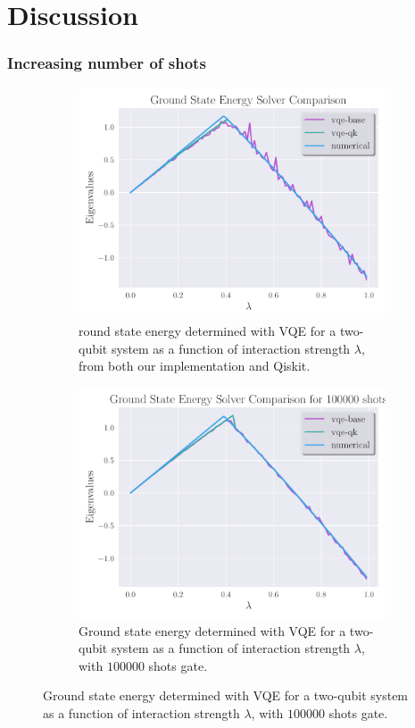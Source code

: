 \documentclass{beamer}
\begin{document}
	

\section{Discussion}
\begin{frame}[t]
	\frametitle{Increasing number of shots}
	\begin{figure}[ht]
		\centering
		\begin{subfigure}[b]{0.45\textwidth}
		\begin{center}
			\includegraphics[width=\textwidth]{../src/plots/2qb-all.pdf}
		\end{center}
		\caption{round state energy determined with VQE for a two-qubit system as a function of interaction strength $\lambda$, from both our implementation and Qiskit.}
		\label{fig:2qb-all}
		\end{subfigure}
		\hfill
		\begin{subfigure}[b]{0.45\textwidth}
		\begin{center}
			\includegraphics[width=\textwidth]{../src/plots/2qb-100000.pdf}	
		\end{center}
		\caption{Ground state energy determined with VQE for a two-qubit system as a function of interaction strength $\lambda$, with $ 100000 $ shots gate.}
		\label{fig:2-qb-all}
		\end{subfigure}
		\label{fig:2-qb}
	\end{figure}


\end{frame}
\end{document}
